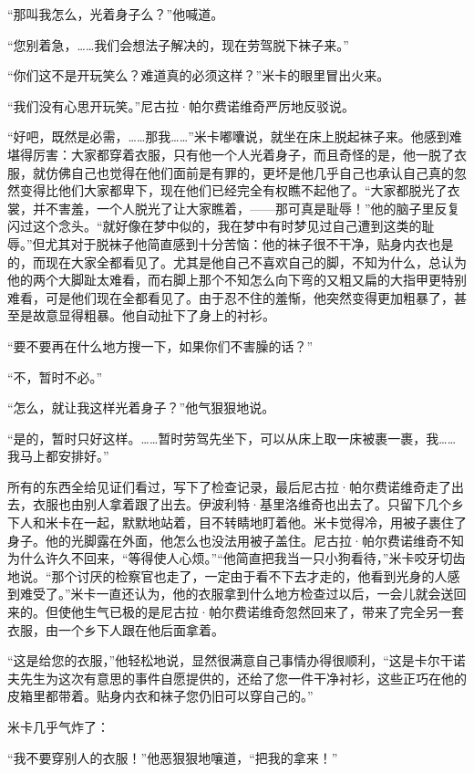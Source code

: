 \par “那叫我怎么，光着身子么？”他喊道。
\par “您别着急，……我们会想法子解决的，现在劳驾脱下袜子来。”
\par “你们这不是开玩笑么？难道真的必须这样？”米卡的眼里冒出火来。
\par “我们没有心思开玩笑。”尼古拉·帕尔费诺维奇严厉地反驳说。
\par “好吧，既然是必需，……那我……”米卡嘟囔说，就坐在床上脱起袜子来。他感到难堪得厉害：大家都穿着衣服，只有他一个人光着身子，而且奇怪的是，他一脱了衣服，就仿佛自己也觉得在他们面前是有罪的，更坏是他几乎自己也承认自己真的忽然变得比他们大家都卑下，现在他们已经完全有权瞧不起他了。“大家都脱光了衣裳，并不害羞，一个人脱光了让大家瞧着，——那可真是耻辱！”他的脑子里反复闪过这个念头。“就好像在梦中似的，我在梦中有时梦见过自己遭到这类的耻辱。”但尤其对于脱袜子他简直感到十分苦恼：他的袜子很不干净，贴身内衣也是的，而现在大家全都看见了。尤其是他自己不喜欢自己的脚，不知为什么，总认为他的两个大脚趾太难看，而右脚上那个不知怎么向下弯的又粗又扁的大指甲更特别难看，可是他们现在全都看见了。由于忍不住的羞惭，他突然变得更加粗暴了，甚至是故意显得粗暴。他自动扯下了身上的衬衫。
\par “要不要再在什么地方搜一下，如果你们不害臊的话？”
\par “不，暂时不必。”
\par “怎么，就让我这样光着身子？”他气狠狠地说。
\par “是的，暂时只好这样。……暂时劳驾先坐下，可以从床上取一床被裹一裹，我……我马上都安排好。”
\par 所有的东西全给见证们看过，写下了检查记录，最后尼古拉·帕尔费诺维奇走了出去，衣服也由别人拿着跟了出去。伊波利特·基里洛维奇也出去了。只留下几个乡下人和米卡在一起，默默地站着，目不转睛地盯着他。米卡觉得冷，用被子裹住了身子。他的光脚露在外面，他怎么也没法用被子盖住。尼古拉·帕尔费诺维奇不知为什么许久不回来，“等得使人心烦。”“他简直把我当一只小狗看待，”米卡咬牙切齿地说。“那个讨厌的检察官也走了，一定由于看不下去才走的，他看到光身的人感到难受了。”米卡一直还认为，他的衣服拿到什么地方检查过以后，一会儿就会送回来的。但使他生气已极的是尼古拉·帕尔费诺维奇忽然回来了，带来了完全另一套衣服，由一个乡下人跟在他后面拿着。
\par “这是给您的衣服，”他轻松地说，显然很满意自己事情办得很顺利，“这是卡尔干诺夫先生为这次有意思的事件自愿提供的，还给了您一件干净衬衫，这些正巧在他的皮箱里都带着。贴身内衣和袜子您仍旧可以穿自己的。”
\par 米卡几乎气炸了：
\par “我不要穿别人的衣服！”他恶狠狠地嚷道，“把我的拿来！”
